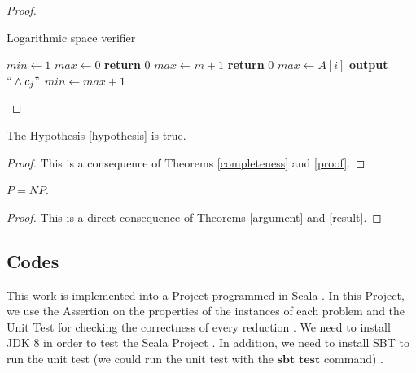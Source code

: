 \documentclass[a4paper,UKenglish,cleveref, autoref]{lipics-v2019}
\begin{document}
\begin{proof}
\begin{algorithm}
\caption{Logarithmic space verifier}\label{algorithm}
\begin{algorithmic}[1]
\State $min \gets 1$
\State $max \gets 0$
\State \textbf{return} $0$
\EndIf
{}
\State $max \gets m + 1$
\State \textbf{return} $0$
\Else
\State $max \gets A[i]$
\EndIf
{}
\State \textbf{output} $``\wedge c_{j}"$
\EndFor
\State $min \gets max + 1$
\EndFor
\EndProcedure
\end{algorithmic}
\end{algorithm}
\end{proof}

\begin{theorem}
\label{result}
The Hypothesis \ref{hypothesis} is true.
\end{theorem}

\begin{proof}
This is a consequence of Theorems \ref{completeness} and \ref{proof}.
\end{proof}

\begin{theorem}
$P = NP$.
\end{theorem}

\begin{proof}
This is a direct consequence of Theorems \ref{argument} and \ref{result}.
\end{proof}

\subsection{Codes}

This work is implemented into a Project programmed in Scala \cite{FV19}. In this Project, we use the Assertion on the properties of the instances of each problem and the Unit Test for checking the correctness of every reduction \cite{FV19}. We need to install JDK 8 in order to test the Scala Project \cite{OD16}. In addition, we need to install SBT to run the unit test (we could run the unit test with the $\textbf{sbt test}$ command) \cite{OD16}.
\end{document}
